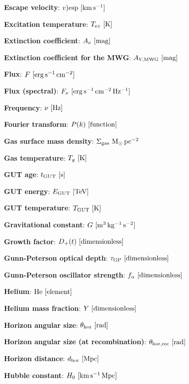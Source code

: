 \documentclass[a4paper,11pt]{article}
\begin{document}
{\noindent}\textbf{Escape velocity}: $v)\mathrm{esp} ~ [{\rm km\,s^{-1}}]$

{\noindent}\textbf{Excitation temperature}: $T_{ex} ~ [{\rm K}]$

{\noindent}\textbf{Extinction coefficient}: $A_\nu ~ [{\rm mag}]$

{\noindent}\textbf{Extinction coefficient for the MWG}: $A_{V,\mathrm{MWG}} ~ [{\rm mag}]$

{\noindent}\textbf{Flux}: $F ~ [{\rm erg\,s^{-1}\,cm^{-2}}]$

{\noindent}\textbf{Flux (spectral)}: $F_\nu ~ [{\rm erg\,s^{-1}\,cm^{-2}\,Hz^{-1}}]$

{\noindent}\textbf{Frequency}: $\nu ~ [{\rm Hz}]$

{\noindent}\textbf{Fourier transform}: $P(k) ~ [{\rm function}]$

{\noindent}\textbf{Gas surface mass density}: $\Sigma_\mathrm{gas} ~ {\rm M_\odot\,pc^{-2}}$

{\noindent}\textbf{Gas temperature}: $T_g ~ [{\rm K}]$

{\noindent}\textbf{GUT age}: $t_\mathrm{GUT} ~ [{\rm s}]$

{\noindent}\textbf{GUT energy}: $E_\mathrm{GUT} ~ [{\rm TeV}]$

{\noindent}\textbf{GUT temperature}: $T_\mathrm{GUT} ~ [{\rm K}]$

{\noindent}\textbf{Gravitational constant}: $G ~ [{\rm m^3\,kg^{-1}\,s^{-2}}]$

{\noindent}\textbf{Growth factor}: $D_+(t) ~ [{\rm dimensionless}]$

{\noindent}\textbf{Gunn-Peterson optical depth}: $\tau_\mathrm{GP} ~ [{\rm dimensionless}]$

{\noindent}\textbf{Gunn-Peterson oscillator strength}: $f_\alpha ~ [{\rm dimensionless}]$

{\noindent}\textbf{Helium}: ${\rm He} ~ [{\rm element}]$

{\noindent}\textbf{Helium mass fraction}: $Y ~ [{\rm dimensionless}]$

{\noindent}\textbf{Horizon angular size}: $\theta_\mathrm{hor} ~ [{\rm rad}]$

{\noindent}\textbf{Horizon angular size (at recombination)}: $\theta_\mathrm{hor,rec} ~ [{\rm rad}]$

{\noindent}\textbf{Horizon distance}: $d_\mathrm{hor} ~ [{\rm Mpc}]$

{\noindent}\textbf{Hubble constant}: $H_0 ~ [{\rm km\,s^{-1}\,Mpc}]$
\end{document}
